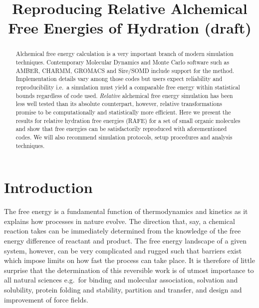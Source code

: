 \documentclass[journal=jctcce,manuscript=article]{achemso}
\title{Reproducing Relative Alchemical Free Energies of Hydration
  (draft)}
\begin{document}
\begin{abstract}
  Alchemical free energy calculation is a very important branch of
  modern simulation techniques.  Contemporary Molecular Dynamics and
  Monte Carlo software such as AMBER, CHARMM, GROMACS and Sire/SOMD
  include support for the method.  Implementation details vary among
  those codes but users expect reliability and reproducibility i.e.\ a
  simulation must yield a comparable free energy within statistical
  bounds regardless of code used.  \emph{Relative} alchemical free
  energy simulation has been less well tested than its absolute
  counterpart, however, relative transformations promise to be
  computationally and statistically more efficient.  Here we present
  the results for relative hydration free energies (RAFE) for a set of
  small organic molecules and show that free energies can be
  satisfactorily reproduced with aforementioned codes.  We will also
  recommend simulation protocols, setup procedures and analysis
  techniques.
\end{abstract}

\begin{tocentry}
\end{tocentry}


\section{Introduction}
\label{sec:intro}

The free energy is a fundamental function of thermodynamics and
kinetics as it explains how processes in nature evolve.  The direction
that, say, a chemical reaction takes can be immediately determined
from the knowledge of the free energy difference of reactant and
product.  The free energy landscape of a given system, however, can be
very complicated and rugged such that barriers exist which impose
limits on how fast the process can take place.  It is therefore of
little surprise that the determination of this reversible work is of
utmost importance to all natural sciences e.g.\ for binding and
molecular association, solvation and solubility, protein folding and
stability, partition and transfer, and design and improvement of force
fields.
\end{document}
